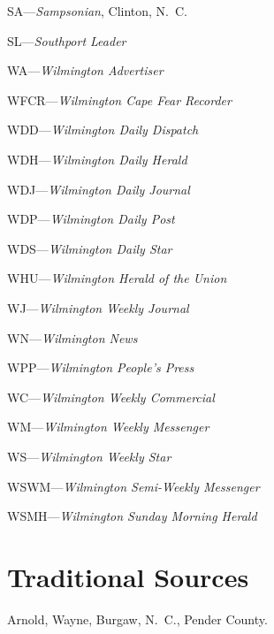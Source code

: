 \documentclass[11pt, a5paper]{book}
\begin{document}
\begin{thebibliography}{99}
  SA---\emph{Sampsonian}, Clinton, N.~C.

  SL---\emph{Southport Leader}

  WA---\emph{Wilmington Advertiser}

  WFCR---\emph{Wilmington Cape Fear Recorder}

  WDD---\emph{Wilmington Daily Dispatch}

  WDH---\emph{Wilmington Daily Herald}

  WDJ---\emph{Wilmington Daily Journal}

  WDP---\emph{Wilmington Daily Post}

  WDS---\emph{Wilmington Daily Star}

  WHU---\emph{Wilmington Herald of the Union}

  WJ---\emph{Wilmington Weekly Journal}

  WN---\emph{Wilmington News}

  WPP---\emph{Wilmington People's Press}

  WC---\emph{Wilmington Weekly Commercial}

  WM---\emph{Wilmington Weekly Messenger}

  WS---\emph{Wilmington Weekly Star}

  WSWM---\emph{Wilmington Semi-Weekly Messenger}

  WSMH---\emph{Wilmington Sunday Morning Herald}

\section*{Traditional Sources}

  Arnold, Wayne, Burgaw, N.~C., Pender County.


\end{thebibliography}
\end{document}

